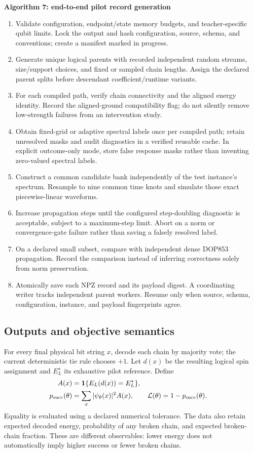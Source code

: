\documentclass[10pt]{article}
\newcommand{\loss}{\mathcal L}
\newenvironment{algsteps}[1]{\par\smallskip\noindent\textbf{Algorithm #1}\begin{enumerate}\setlength{\itemsep}{2pt}\setlength{\parskip}{1pt}}{\end{enumerate}\smallskip}
\begin{document}
\begin{algsteps}{7: end-to-end pilot record generation}
\item Validate configuration, endpoint/state memory budgets, and teacher-specific
       qubit limits. Lock the output and hash configuration, source, schema, and
       conventions; create a manifest marked in progress.
\item Generate unique logical parents with recorded independent random streams,
       size/support choices, and fixed or sampled chain lengths. Assign the
       declared parent splits before descendant coefficient/runtime variants.
\item For each compiled path, verify chain connectivity and the aligned energy
       identity. Record the aligned-ground compatibility flag; do not silently
       remove low-strength failures from an intervention study.
\item Obtain fixed-grid or adaptive spectral labels once per compiled path;
       retain unresolved masks and audit diagnostics in a verified reusable
       cache. In explicit outcome-only mode, store false response masks rather
       than inventing zero-valued spectral labels.
\item Construct a common candidate bank independently of the test instance's
       spectrum. Resample to nine common time knots and simulate those exact
       piecewise-linear waveforms.
\item Increase propagation steps until the configured step-doubling diagnostic
       is acceptable, subject to a maximum-step limit. Abort on a norm or
       convergence-gate failure rather than saving a falsely resolved label.
\item On a declared small subset, compare with independent dense DOP853
       propagation. Record the comparison instead of inferring correctness
       solely from norm preservation.
\item Atomically save each NPZ record and its payload digest. A coordinating
       writer tracks independent parent workers. Resume only when source,
       schema, configuration, instance, and payload fingerprints agree.
\end{algsteps}

\subsection{Outputs and objective semantics}
For every final physical bit string $x$, decode each chain by majority vote;
the current deterministic tie rule chooses $+1$. Let $d(x)$ be the resulting
logical spin assignment and $E_L^\star$ its exhaustive pilot reference. Define
\begin{align}
 A(x)&=\mathbf 1\{E_L(d(x))=E_L^\star\},\\
 p_{\rm succ}(\theta)&=\sum_x|\psi_\theta(x)|^2A(x),\qquad
 \loss(\theta)=1-p_{\rm succ}(\theta).
\end{align}
Equality is evaluated using a declared numerical tolerance. The data also
retain expected decoded energy, probability of any broken chain, and expected
broken-chain fraction. These are different observables: lower energy does not
automatically imply higher success or fewer broken chains.
\end{document}
